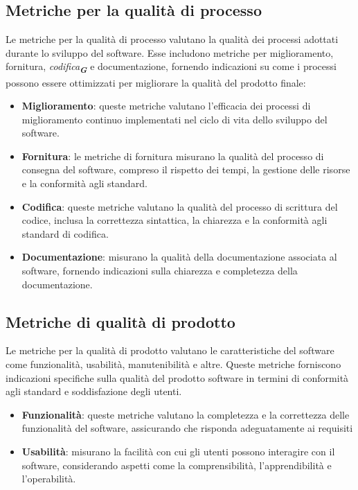 \subsection{Metriche per la qualità di processo}
Le metriche per la qualità di processo valutano la qualità dei processi adottati durante 
lo sviluppo del software. Esse includono metriche per miglioramento, fornitura, 
\emph{codifica}\textsubscript{\textit{\textbf{G}}} e documentazione, fornendo indicazioni su come i processi 
possono essere ottimizzati per migliorare la qualità del prodotto finale:
\begin{itemize}
    \item \textbf{Miglioramento}: queste metriche valutano l’efficacia dei processi di miglioramento continuo implementati
    nel ciclo di vita dello sviluppo del software.
    \item \textbf{Fornitura}: le metriche di fornitura misurano la qualità del processo di consegna del software, compreso 
    il rispetto dei tempi, la gestione delle risorse e la conformità agli standard.
    \item \textbf{Codifica}: queste metriche valutano la qualità del processo di scrittura del codice, inclusa la correttezza 
    sintattica, la chiarezza e la conformità agli standard di codifica.
    \item \textbf{Documentazione}: misurano la qualità della documentazione associata al software, fornendo indicazioni sulla
    chiarezza e completezza della documentazione.
\end{itemize}


\subsection{Metriche di qualità di prodotto}
Le metriche per la qualità di prodotto valutano le caratteristiche del software come funzionalità, 
usabilità, manutenibilità e altre. Queste metriche forniscono indicazioni specifiche
sulla qualità del prodotto software in termini di conformità agli standard e soddisfazione
degli utenti.
\begin{itemize}
    \item \textbf{Funzionalità}: queste metriche valutano la completezza e la correttezza delle funzionalità del software,
    assicurando che risponda adeguatamente ai requisiti
    \item \textbf{Usabilità}: misurano la facilità con cui gli utenti possono interagire con il software, considerando aspetti
    come la comprensibilità, l’apprendibilità e l’operabilità.
\end{itemize}



